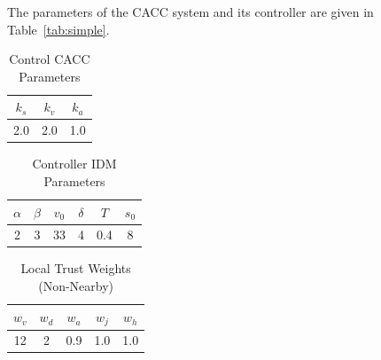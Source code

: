 \documentclass[letterpaper, 10pt, conference]{ieeeconf}  %
\def\eqref#1{(\ref{#1})}
\begin{document}

The parameters of the CACC system and its controller are given in Table~\ref{tab:simple}. 
\begin{table}[h!]
\centering
\caption{Control CACC Parameters}
\begin{tabular}{|c|c|c|}
\hline
$k_s$ & $k_v$ & $k_a$ \\
\hline
2.0 & 2.0 & 1.0 \\
\hline
\end{tabular}
\end{table}

\begin{table}[h!]
\centering
\caption{Controller IDM Parameters}
\begin{tabular}{|c|c|c|c|c|c|}
\hline
$\alpha$ & $\beta$ & $v_0$ & $\delta$ & $T$ & $s_0$ \\
\hline
2 & 3 & 33 & 4 & 0.4 & 8 \\
\hline
\end{tabular}
\end{table}

\begin{table}[h!]
\centering
\caption{Local Trust Weights (Non-Nearby)}
\begin{tabular}{|c|c|c|c|c|}
\hline
$w_v$ & $w_d$ & $w_a$ & $w_j$ & $w_h$ \\
\hline
12 & 2 & 0.9 & 1.0 & 1.0 \\
\hline
\end{tabular}
\end{table}

\end{document}
